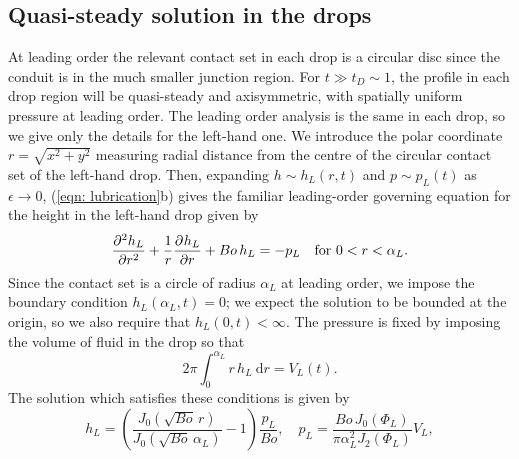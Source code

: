 \documentclass{jfm}
\newcommand{\pD}[3]{\frac{ \partial^{#3} {#1} }{ \partial {#2}^{#3} }}
\newcommand{\dv}[1]{ \ \text{d} #1}
\newcommand{\besselj}[2]{J_{#1}\!\left(#2\right)}
\begin{document}
\subsection{Quasi-steady solution in the drops}\label{sec: drops}
At leading order   the relevant contact set in each drop is a circular disc since the  conduit  is in the much smaller junction region.
For $t \gg t_{D} \sim 1$,   the profile in each  drop region will be quasi-steady and axisymmetric, with spatially uniform pressure at leading order.  
The leading order analysis is the same in each drop, so we give only the details for the left-hand one.
We introduce  the  polar coordinate $r=\sqrt{x^2 +y^2}$   measuring   radial distance   from the centre of the circular contact set of the  left-hand drop.  
Then, expanding $h \sim h_L(r,t)$  and $ p\sim p_L(t)$ as $\epsilon \to 0$, (\ref{eqn: lubrication}b) gives the familiar  leading-order governing equation  for the height in the  left-hand drop given by
\begin{equation}
\pD{h_L}{r}{2}  +\frac{1}{r} \pD{h_L}{r}{} +Bo\, h_L = -p_L  \quad \text{for $  0<r<\alpha_L$.}  \label{eqn: bessel}
\end{equation}
Since the contact set  is a circle of radius $\alpha_L $ at leading order, we impose the boundary condition   $h_L(\alpha_L ,t)=0$; we   expect the solution to be bounded at the origin, so we also  require that $h_L(0,t) < \infty$.
The pressure is fixed by imposing the volume of fluid in the drop so that 
\begin{equation}
 2 \pi \int_0^{\alpha_L} r \, h_L\dv{r} = V_L(t).
\end{equation}  
The solution which satisfies these  conditions is given by 
\label{eqn: drop height left}%
\begin{equation}
 h_L=\left(  \frac{     \besselj{0}{\sqrt{Bo}\, r }  }{ \besselj{0}{\sqrt{Bo} \,\alpha_L }  } -1  \right) \frac{p_L}{Bo}, \quad  p_L = \frac{ Bo \, \besselj{0}{\Phi_L}}{\pi \alpha_L^2 \besselj{2}{\Phi_L } }V_L
,  \tag{\theequation a,b} 
\end{equation}
\end{document}
